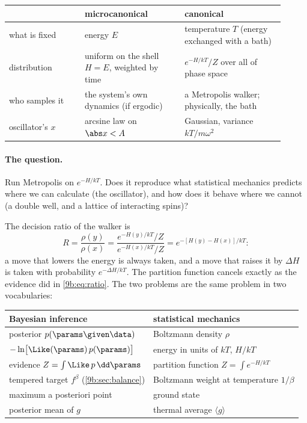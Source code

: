 \begin{center}
\small
\begin{tabular}{@{}p{0.25\linewidth}p{0.33\linewidth}p{0.33\linewidth}@{}}
\toprule
 & microcanonical & canonical \\
\midrule
what is fixed & energy $E$ & temperature $T$ (energy exchanged with a bath) \\
distribution & uniform on the shell $H=E$, weighted by time & $e^{-H/kT}/Z$ over all of phase space \\
who samples it & the system's own dynamics (if ergodic) & a Metropolis walker; physically, the bath \\
oscillator's $x$ & arcsine law on $\abs x<A$ & Gaussian, variance $kT/m\omega^2$ \\
\bottomrule
\end{tabular}
\end{center}

\paragraph{The question.} Run Metropolis on $e^{-H/kT}$. Does it reproduce what statistical
mechanics predicts where we can calculate (the oscillator), and how does it behave where we cannot
(a double well, and a lattice of interacting spins)?

The decision ratio of the walker is
\begin{equation}
  R=\frac{\rho(y)}{\rho(x)}=\frac{e^{-H(y)/kT}/Z}{e^{-H(x)/kT}/Z}=e^{-[H(y)-H(x)]/kT}:
  \label{9b:eq:boltzmann-ratio}
\end{equation}
a move that lowers the energy is always taken, and a move that raises it by $\Delta H$ is taken
with probability $e^{-\Delta H/kT}$. The partition function cancels exactly as the evidence did in
\eqref{9b:eq:ratio}. The two problems are the same problem in two vocabularies:
\begin{center}
\small
\begin{tabular}{@{}ll@{}}
\toprule
Bayesian inference & statistical mechanics \\
\midrule
posterior $p(\params\given\data)$ & Boltzmann density $\rho$ \\
$-\ln\bigl[\Like(\params)\,p(\params)\bigr]$ & energy in units of $kT$, $H/kT$ \\
evidence $Z=\int\Like\,p\,\dd\params$ & partition function $Z=\int e^{-H/kT}$ \\
tempered target $f^\beta$ (\cref{9b:sec:balance}) & Boltzmann weight at temperature $1/\beta$ \\
maximum a posteriori point & ground state \\
posterior mean of $g$ & thermal average $\langle g\rangle$ \\
\bottomrule
\end{tabular}
\end{center}


